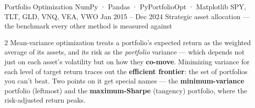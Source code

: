 \documentclass{pyportfolios-note}
\begin{document}
\thispagestyle{notecover}





\notecard
  {Portfolio Optimization}
  {NumPy · Pandas · PyPortfolioOpt · Matplotlib}
  {SPY, TLT, GLD, VNQ, VEA, VWO}
  {Jan 2015 – Dec 2024}
  {Strategic asset allocation — the benchmark every other method is measured
   against}

\noteneedroom{150bp}

\begin{multicols}{2}
Mean-variance optimization treats a portfolio's expected return as the weighted
average of its assets, and its risk as the \textit{portfolio} variance — which
depends not just on each asset's volatility but on how they \textbf{co-move}.
Minimizing variance for each level of target return traces out the
\textbf{efficient frontier}: the set of portfolios you can't beat. Two points on
it get special names — the \textbf{minimum-variance} portfolio (leftmost) and
the \textbf{maximum-Sharpe} (tangency) portfolio, where the risk-adjusted return
peaks.
\end{multicols}

\noteneedroom{170bp}
\end{document}
